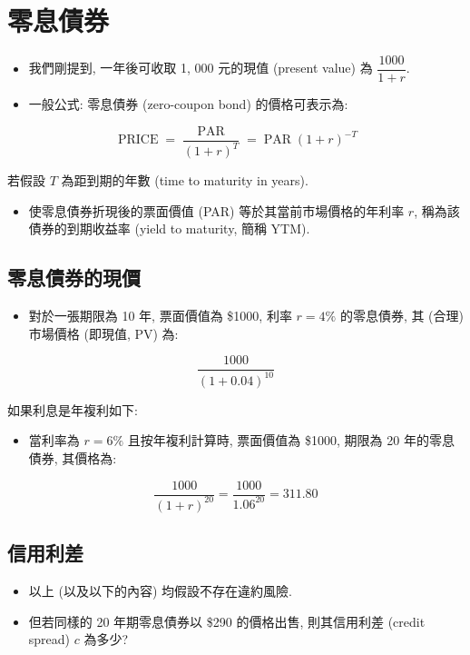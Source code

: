 \documentclass[letterpaper]{article}
\begin{document}
		\section{零息債券}
		\begin{itemize}
			\item 我們剛提到, 一年後可收取 1, 000 元的現值 (present value) 為 \(\dfrac{1000}{1 + r}\).  
			\item 一般公式: 零息債券 (zero-coupon bond) 的價格可表示為: 
		\end{itemize}
		
		$$
		\operatorname{PRICE}=\frac{\operatorname{PAR}}{ (1+r) ^{T}}=\operatorname{PAR} (1+r) ^{-T}
		$$
		
		若假設 \( T \) 為距到期的年數 (time to maturity in years).
		
		
		\begin{itemize}
			\item 使零息債券折現後的票面價值 (PAR) 等於其當前市場價格的年利率 \( r \), 稱為該債券的到期收益率 (yield to maturity, 簡稱 YTM).  
		\end{itemize}
		
		\subsection{零息債券的現價}
		\begin{itemize}
			\item 對於一張期限為 10 年, 票面價值為 \$1000, 利率 \( r = 4\% \) 的零息債券, 其 (合理) 市場價格 (即現值, PV) 為: 
		\end{itemize}
		
		
		$$
		\frac{1000}{ (1+0.04) ^{10}}
		$$
		
		如果利息是年複利如下: 
		
		\begin{itemize}
			\item 當利率為 \( r = 6\% \) 且按年複利計算時, 票面價值為 \$1000, 期限為 20 年的零息債券, 其價格為: 
			
		\end{itemize}
		
		$$
		\frac{1000}{ (1+r) ^{20}}=\frac{1000}{1.06^{20}}=311.80
		$$
		
		\subsection{信用利差}
		\begin{itemize}
			\item 以上 (以及以下的內容) 均假設不存在違約風險.  
			\item 但若同樣的 20 年期零息債券以 \$290 的價格出售, 則其信用利差 (credit spread) \( c \) 為多少? 
		\end{itemize}
		
\end{document}
